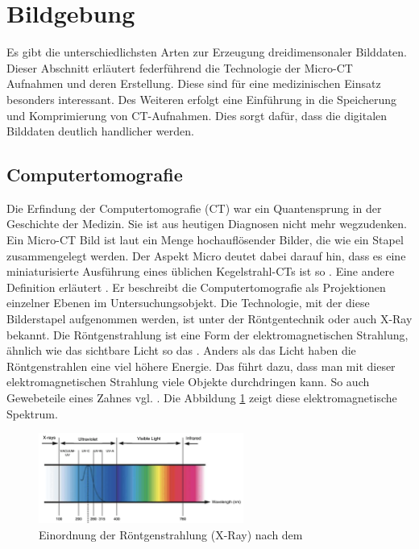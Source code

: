 \section{Bildgebung}
\label{sec:technologisch} Es gibt die unterschiedlichsten Arten zur Erzeugung
dreidimensonaler Bilddaten. Dieser Abschnitt erläutert federführend die Technologie
der Micro-CT Aufnahmen und deren Erstellung. Diese sind für eine medizinischen
Einsatz besonders interessant. Des Weiteren erfolgt eine Einführung in die Speicherung
und Komprimierung von CT-Aufnahmen. Dies sorgt dafür, dass die digitalen Bilddaten
deutlich handlicher werden.

\subsection{Computertomografie}
\label{subsec:computertomografie} Die Erfindung der Computertomografie (CT) war ein
Quantensprung in der Geschichte der Medizin. Sie ist aus heutigen Diagnosen
nicht mehr wegzudenken. Ein Micro-CT Bild ist laut \citet[Abstract]{baird2017} ein
Menge hochauflösender Bilder, die wie ein Stapel zusammengelegt werden. Der Aspekt
Micro deutet dabei darauf hin, dass es eine miniaturisierte Ausführung eines
üblichen Kegelstrahl-CTs ist so \citet[Seite 340]{buzug2011}. Eine andere Definition
erläutert \citet{lehmann2013bildverarbeitung}. Er beschreibt die Computertomografie
als Projektionen einzelner Ebenen im Untersuchungsobjekt. Die Technologie, mit der
diese Bilderstapel aufgenommen werden, ist unter der Röntgentechnik oder auch X-Ray
bekannt. Die Röntgenstrahlung ist eine Form der elektromagnetischen Strahlung,
ähnlich wie das sichtbare Licht so das \citet{nib2024}. Anders als das Licht
haben die Röntgenstrahlen eine viel höhere Energie. Das führt dazu, dass man mit
dieser elektromagnetischen Strahlung viele Objekte durchdringen kann. So auch Gewebeteile
eines Zahnes vgl. \citep{nib2024}. Die Abbildung \ref{fig:spectrum} zeigt diese
elektromagnetische Spektrum.

\begin{figure}[h]
	\centering
	\includegraphics[width=0.6\textwidth]{img/x_ray.jpg}
	\caption{Einordnung der Röntgenstrahlung (X-Ray) nach dem \citet{zwinkels2015}}
	\label{fig:spectrum}
\end{figure}

